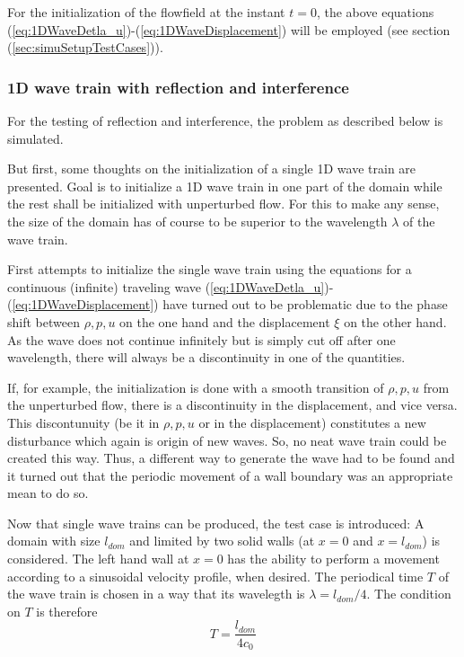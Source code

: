 \documentclass{report}
\begin{document}
For the initialization of the flowfield at the instant $t=0$, the above equations (\ref{eq:1DWaveDetla_u})-(\ref{eq:1DWaveDisplacement}) will be employed (see section (\ref{sec:simuSetupTestCases})).


\subsubsection{1D wave train with reflection and interference}
For the testing of reflection and interference, the problem as described below is simulated.

But first, some thoughts on the initialization of a single 1D wave train are presented.
Goal is to initialize a 1D wave train in one part of the domain while the rest shall be initialized with unperturbed flow. For this to make any sense, the size of the domain has of course to be superior to the wavelength $\lambda$ of the wave train. 

First attempts to initialize the single wave train using the equations for a continuous (infinite) traveling wave (\ref{eq:1DWaveDetla_u})-(\ref{eq:1DWaveDisplacement}) have turned out to be problematic due to the phase shift between $\rho,p,u$ on the one hand and the displacement $\xi$ on the other hand. As the wave does not continue infinitely but is simply cut off after one wavelength, there will always be a discontinuity in one of the quantities.  

If, for example, the initialization is done with a smooth transition of $\rho,p,u$ from the unperturbed flow, there is a discontinuity in the displacement, and vice versa. This discontunuity (be it in $\rho,p,u$ or in the displacement) constitutes a new disturbance which again is origin of new waves. So, no neat wave train could be created this way. 
Thus, a different way to generate the wave had to be found and it turned out that the periodic movement of a wall boundary was an appropriate mean to do so. 

Now that single wave trains can be produced, the test case is introduced:
A domain with size $l_{\mathit{dom}}$ and limited by two solid walls (at $x=0$ and $x=l_{\mathit{dom}}$) is considered. The left hand wall at $x=0$ has the ability to perform a movement according to a sinusoidal velocity profile, when desired.
The periodical time $T$ of the wave train is chosen in a way that its wavelegth is
$\lambda=l_{\mathit{dom}}/4$. The condition on $T$ is therefore
\begin{equation}
 T=\frac{l_{\mathit{dom}}}{4 c_0}
\end{equation}
\end{document}
